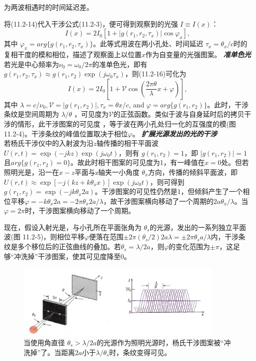 \documentclass[UTF8]{ctexart}
\numberwithin{figure}{subsection}
\numberwithin{table}{subsection}
\begin{document}
为两波相遇时的时间延迟差。
\par 将(11.2-14)代入干涉公式(11.2-3)，便可得到观察到的光强 $ I \equiv I(x) $：
\begin{equation}
I(x) = 2 I_0 [1 + \lvert g(r_1, r_2, \tau_x) \rvert \cos \varphi_x] ,
\end{equation}
其中 $ \varphi_x = arg\{g(r_1, r_2, \tau_x)\}$。此等式用波在两小孔处、时间延迟 $ \tau_x = \theta_x / c$时的复相干度的模和相位，描述了观察面上以位置$x$作为自变量的光强图案。
\bigbreak\noindent\textcolor{ksc}{\textbf{\textsl{准单色光}}}\\
若光是中心频率为$ \nu_0 = \omega_0 / 2\pi$的准单色光，即有$ g(r_1, r_2, \tau_x) \approx g(r_1, r_2) \exp (j\omega_0 \tau_x) $，则(11.2-16)可化为
\begin{equation}
I(x) = 2 I_0 [1 + \mathcal{V} \cos (\frac{2\pi \theta}{\lambda}x + \varphi)] ,
\end{equation}
其中 $ \lambda = c / \nu_0, \mathcal{V} = \lvert g(r_1, r_2) \rvert, \tau_x = \theta x / c $, and $ \varphi = arg\{g(r_1, r_2)\}$。此时，干涉条纹是空间周期为 $ \lambda / \theta $ ，可见度为$ \mathcal{V} $的正弦函数。类似于波与自身延时后的拷贝干涉的情形，此干涉图案的可见度 ，等于波在两小孔处归一化的互强度的模(图 11.2-4)。干涉条纹的峰值位置取决于相位$\varphi$。
\bigbreak\noindent\textcolor{ksc}{\textbf{\textsl{扩展光源发出的光的干涉}}}\\
若杨氏干涉仪中的入射波为沿$z$轴传播的相干平面波$ U(r,t) = \exp(-jkz) \exp(j\omega_0 t) $，则有 $ g(r_1, r_2) = 1 $，即 $ \lvert g(r_1, r_2) \rvert = 1 $且$ arg\{g(r_1, r_2) = 0\} $。故此时相干图案的可见度为1，有一峰值在$ x = 0 $处。但若照明光是，沿一在$x-z$平面与z轴夹一小角度 $\theta_x$方向，传播的倾斜平面波，即 $ U(r,t) \approx \exp[-j(kz + k\theta_x x)] \exp (j\omega_0 t) $，则可得到$ g(r_1, r_2) = \exp(-jk\theta_x 2a) $。干涉图案的可见性仍然是1，但倾斜产生了一个相位平移$ \varphi = -k\theta_x 2a = -2\pi \theta_x 2a / \lambda $，故干涉图案横向移动了一个周期的$ 2a \theta_x / \lambda $。当 $ \varphi = 2\pi $时，干涉图案横向移动了一个周期。
\par 现在，假设入射光是，与小孔所在平面张角为 $ \theta_s $的光源，发出的一系列独立平面波(图 11.2-5)，则相位平移$ \varphi $便落在范围$ \pm 2\pi (\theta_s / 2) 2a \lambda = \pm 2\pi \theta_s a / \lambda $内，干涉条纹是多个移位后的正弦曲线的叠加。若$ \theta_s = \lambda / 2a $，则$\varphi$的变化范围为$ \pm \pi $，这足够“冲洗掉”干涉图案，使其可见度降至0。
\begin{figure}[H]
\centering
\includegraphics[width=0.9\textwidth]{11_2_5.PNG}
\caption{当使用角直径 $ \theta_s > \lambda / 2a $的光源作为照明光源时，杨氏干涉图案被“冲洗掉”了。当距离$2a$小于$ \lambda / \theta_s $时，条纹变得可见。}
\label{fig: 11_2_5}
\end{figure}
\end{document}
